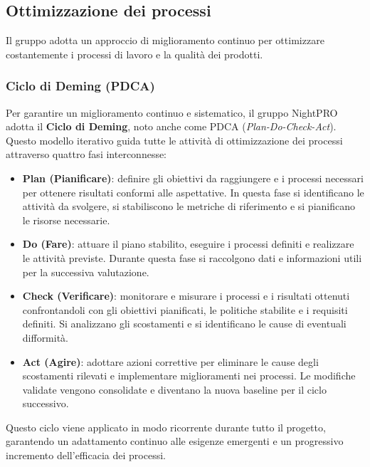 \documentclass[a4paper, 11pt, oneside]{scrartcl} %
\begin{document}
\subsection{Ottimizzazione dei processi}
Il gruppo adotta un approccio di miglioramento continuo per ottimizzare costantemente i processi di lavoro e la qualità dei prodotti.

\subsubsection{Ciclo di Deming (PDCA)}
Per garantire un miglioramento continuo e sistematico, il gruppo NightPRO adotta il \textbf{Ciclo di Deming}{\scriptsize{}}, noto anche come PDCA{\scriptsize{}} (\textit{Plan-Do-Check-Act}).
Questo modello iterativo guida tutte le attività di ottimizzazione dei processi attraverso quattro fasi interconnesse:

\begin{itemize}
    \item \textbf{Plan (Pianificare)}: definire gli obiettivi da raggiungere e i processi necessari per ottenere risultati conformi alle aspettative. In questa fase si identificano le attività da svolgere, si stabiliscono le metriche di riferimento e si pianificano le risorse necessarie.
    
    \item \textbf{Do (Fare)}: attuare il piano stabilito, eseguire i processi definiti e realizzare le attività previste. Durante questa fase si raccolgono dati e informazioni utili per la successiva valutazione.
    
    \item \textbf{Check (Verificare)}: monitorare e misurare i processi e i risultati ottenuti confrontandoli con gli obiettivi pianificati, le politiche stabilite e i requisiti definiti. Si analizzano gli scostamenti e si identificano le cause di eventuali difformità.
    
    \item \textbf{Act (Agire)}: adottare azioni correttive per eliminare le cause degli scostamenti rilevati e implementare miglioramenti nei processi. Le modifiche validate vengono consolidate e diventano la nuova baseline per il ciclo successivo.
\end{itemize}

\noindent
Questo ciclo viene applicato in modo ricorrente durante tutto il progetto, garantendo un adattamento continuo alle esigenze emergenti e un progressivo incremento dell'efficacia dei processi.
\end{document}
